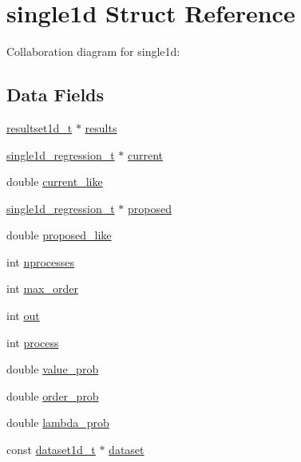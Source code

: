 \hypertarget{structsingle1d}{}\section{single1d Struct Reference}
\label{structsingle1d}


Collaboration diagram for single1d\+:
\subsection*{Data Fields}
\begin{DoxyCompactItemize}
\item 
\hyperlink{resultset1d_8h_ae2ef1c63a8e796e51d39d8b7c2cdfa72}{resultset1d\+\_\+t} $\ast$ \hyperlink{structsingle1d_a7ab4e0dbdaadda57be44987a63ad4e4d}{results}
\item 
\hyperlink{single1d__regression_8h_a3add7bb996ad3a6f4f4bcf2f2d18f58c}{single1d\+\_\+regression\+\_\+t} $\ast$ \hyperlink{structsingle1d_a7bd06a9ab4600604406abb5cfcbf1906}{current}
\item 
double \hyperlink{structsingle1d_ad732cdca6871b69c57674560e5bd7b70}{current\+\_\+like}
\item 
\hyperlink{single1d__regression_8h_a3add7bb996ad3a6f4f4bcf2f2d18f58c}{single1d\+\_\+regression\+\_\+t} $\ast$ \hyperlink{structsingle1d_ae70a37637c7d83688bb73f317acc902b}{proposed}
\item 
double \hyperlink{structsingle1d_a76a0b0fefcd9fb6fb9593adbfb99cac5}{proposed\+\_\+like}
\item 
int \hyperlink{structsingle1d_a13f9d4b58029ca02041818e2626869b8}{nprocesses}
\item 
int \hyperlink{structsingle1d_ac304ae02aa91a647f08b583df962714e}{max\+\_\+order}
\item 
int \hyperlink{structsingle1d_a422c09cc991d96ed1229335722c7883e}{out}
\item 
int \hyperlink{structsingle1d_ad4ffb2d4180386092485f854850fb4ed}{process}
\item 
double \hyperlink{structsingle1d_a5adc705aed86890610f261af8111b2ec}{value\+\_\+prob}
\item 
double \hyperlink{structsingle1d_abbd3eb5dba3b0c7d2c5773b1b07a5ad6}{order\+\_\+prob}
\item 
double \hyperlink{structsingle1d_ad2d2fa880fec64d4278e0820934e5426}{lambda\+\_\+prob}
\item 
const \hyperlink{dataset1d_8h_a232f8372957af83ed6a261e9b89dd8f6}{dataset1d\+\_\+t} $\ast$ \hyperlink{structsingle1d_ab4e457d5bc572feca1d1ffca7f532120}{dataset}

\end{DoxyCompactItemize}
